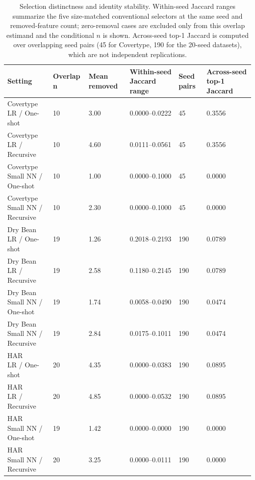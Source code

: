 \begin{table}[t]
\centering
\caption{Selection distinctness and identity stability. Within-seed Jaccard ranges summarize the five size-matched conventional selectors at the same seed and removed-feature count; zero-removal cases are excluded only from this overlap estimand and the conditional $n$ is shown. Across-seed top-1 Jaccard is computed over overlapping seed pairs (45 for Covertype, 190 for the 20-seed datasets), which are not independent replications.}
\label{tab:t3-h1-compact}
\scriptsize
\begin{tabular}{llllll}
\hline
Setting & Overlap n & Mean removed & Within-seed Jaccard range & Seed pairs & Across-seed top-1 Jaccard \\
\hline
\shortstack{Covertype\\LR / One-shot} & 10 & 3.00 & 0.0000--0.0222 & 45 & 0.3556 \\
\shortstack{Covertype\\LR / Recursive} & 10 & 4.60 & 0.0111--0.0561 & 45 & 0.3556 \\
\shortstack{Covertype\\Small NN / One-shot} & 10 & 1.00 & 0.0000--0.1000 & 45 & 0.0000 \\
\shortstack{Covertype\\Small NN / Recursive} & 10 & 2.30 & 0.0000--0.1000 & 45 & 0.0000 \\
\shortstack{Dry Bean\\LR / One-shot} & 19 & 1.26 & 0.2018--0.2193 & 190 & 0.0789 \\
\shortstack{Dry Bean\\LR / Recursive} & 19 & 2.58 & 0.1180--0.2145 & 190 & 0.0789 \\
\shortstack{Dry Bean\\Small NN / One-shot} & 19 & 1.74 & 0.0058--0.0490 & 190 & 0.0474 \\
\shortstack{Dry Bean\\Small NN / Recursive} & 19 & 2.84 & 0.0175--0.1011 & 190 & 0.0474 \\
\shortstack{HAR\\LR / One-shot} & 20 & 4.35 & 0.0000--0.0383 & 190 & 0.0895 \\
\shortstack{HAR\\LR / Recursive} & 20 & 4.85 & 0.0000--0.0532 & 190 & 0.0895 \\
\shortstack{HAR\\Small NN / One-shot} & 19 & 1.42 & 0.0000--0.0000 & 190 & 0.0000 \\
\shortstack{HAR\\Small NN / Recursive} & 20 & 3.25 & 0.0000--0.0111 & 190 & 0.0000 \\
\hline
\end{tabular}
\end{table}
